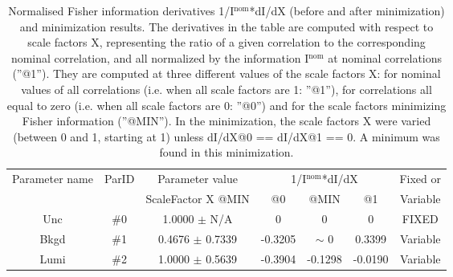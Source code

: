 \begin{table}[H]
\scriptsize
\begin{center}
\renewcommand{\arraystretch}{1.1}
\begin{tabular}{|c|c|c|ccc|c|}
\hline
Parameter name & ParID & Parameter value &\multicolumn{3}{|c|}{1/I$^\mathrm{nom}$*dI/dX} & Fixed or\\
 & & ScaleFactor X @MIN & @0 & @MIN & @1 & Variable\\
\hline
 {\tiny Unc} & \#0 &    1.0000 $\pm$ N/A & 0 & 0 & 0 & FIXED \\
 {\tiny Bkgd} & \#1 &    0.4676 $\pm$    0.7339 &   -0.3205 & {\tiny $\sim$ }0 &    0.3399 & Variable \\
 {\tiny Lumi} & \#2 &    1.0000 $\pm$    0.5639 &   -0.3904 &   -0.1298 &   -0.0190 & Variable \\
\hline
\end{tabular}
\renewcommand{\arraystretch}{1}
\caption{Normalised Fisher information derivatives 1/I$^\mathrm{nom}$*dI/dX (before and after minimization) and minimization results.  The derivatives in the table are computed with respect to scale factors X, representing the ratio of a given correlation to the corresponding nominal correlation, and all normalized by the information I$^\mathrm{nom}$ at nominal correlations (''@1''). They are computed at three different values of the scale factors X: for nominal values of all correlations (i.e. when all scale factors are 1: ''@1''), for correlations all equal to zero (i.e. when all scale factors are 0: ''@0'') and for the scale factors minimizing Fisher information (''@MIN''). In the minimization, the scale factors X were varied (between 0 and 1, starting at 1) unless dI/dX@0 == dI/dX@1 == 0. A minimum was found in this minimization.}
\end{center}
\end{table}
